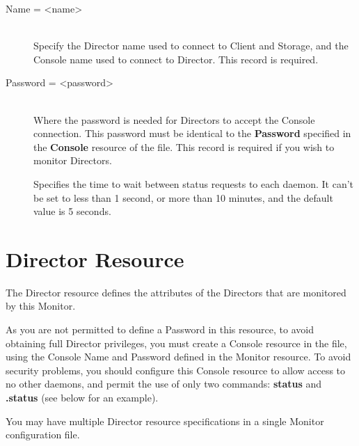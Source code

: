 \begin{description}

\item [Name = {\textless}name{\textgreater}] \hfill \\
Specify the Director name used to connect  to Client and Storage, and the
Console name used to connect to Director.  This record is required.

\item [Password = {\textless}password{\textgreater}] \hfill \\
Where the password is needed for Directors to accept the Console
connection.  This password must be identical to the {\bf Password} specified
in  the {\bf Console} resource of the 
file. This record is required if you wish to monitor Directors.

Specifies the time to wait  between status requests to each daemon. It can't
be set to less than  1 second, or more than 10 minutes, and the default value
is 5 seconds.
\end{description}

\section{Director Resource}
\label{DirectorResource2}

The Director resource defines the attributes of the Directors that are
monitored by this Monitor.

As you are not permitted to define a Password in this resource, to avoid
obtaining full Director privileges, you must create a Console resource in the
 file, using the
Console Name and Password defined in the Monitor resource. To avoid security
problems, you should configure this Console resource to allow access to no
other daemons, and permit the use of only two commands: {\bf status} and {\bf
.status} (see below for an example).

You may have multiple Director resource specifications in a single Monitor
configuration file.

